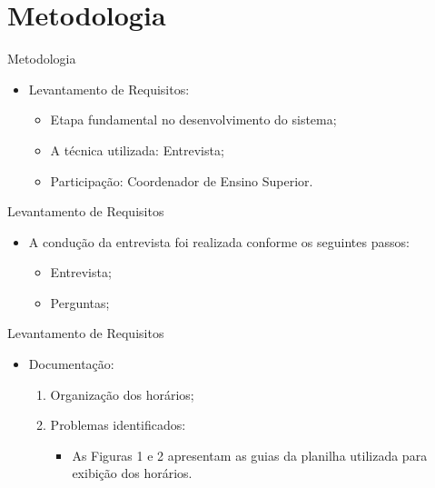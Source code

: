 \section{Metodologia}

\begin{frame}{Metodologia}
    \begin{itemize}
        \item Levantamento de Requisitos: \vspace{0.5cm}
              \begin{itemize}
                  \item Etapa fundamental no desenvolvimento do sistema; \vspace{0.5cm}
                  \item A técnica utilizada: Entrevista; \vspace{0.5cm}
                  \item Participação: Coordenador de Ensino Superior. \vspace{0.5cm}
              \end{itemize}
    \end{itemize}
\end{frame}

\begin{frame}{Levantamento de Requisitos}
    \begin{itemize}
        \item A condução da entrevista foi realizada conforme os seguintes passos: \vspace{0.5cm}
              \begin{itemize}
                  \item Entrevista; \vspace{0.5cm}
                  \item Perguntas; \vspace{0.5cm}
              \end{itemize}
    \end{itemize}
\end{frame}

\begin{frame}{Levantamento de Requisitos}
    \begin{itemize}
        \item Documentação: \vspace{0.5cm}
              \begin{enumerate}
                  \item Organização dos horários; \vspace{0.5cm}
                  \item Problemas identificados: \vspace{0.5cm}
                        \begin{itemize}
                            \item As Figuras 1 e 2 apresentam as guias da planilha utilizada para exibição dos horários.
                        \end{itemize}
              \end{enumerate}
    \end{itemize}
\end{frame}

